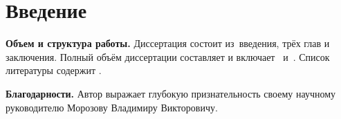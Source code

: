 \chapter*{Введение}							%

\newcommand{\actuality}{\textbf\actualityTXT}
\newcommand{\progress}{}
\newcommand{\aim}{{\textbf\aimTXT}}
\newcommand{\tasks}{\textbf{\tasksTXT}}
\newcommand{\researchsubject}{\textbf{\researchsubjectTXT}}
\newcommand{\novelty}{\textbf{\noveltyTXT}}
\newcommand{\influence}{\textbf{\influenceTXT}}
\newcommand{\methods}{\textbf{\methodsTXT}}
\newcommand{\defpositions}{\textbf{\defpositionsTXT}}
\newcommand{\reliability}{\textbf{\reliabilityTXT}}
\newcommand{\probation}{\textbf{\probationTXT}}
\newcommand{\contribution}{\textbf{\contributionTXT}}
\newcommand{\publications}{\textbf{\publicationsTXT}}


\textbf{Объем и структура работы.} Диссертация состоит из~введения, трёх глав и заключения.
Полный объём диссертации составляет  и включает~ и~.
Список литературы содержит .

\textbf{Благодарности.} Автор выражает глубокую признательность своему научному
руководителю Морозову Владимиру Викторовичу.

